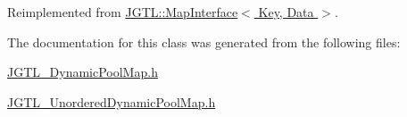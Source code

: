 Reimplemented from \hyperlink{class_j_g_t_l_1_1_map_interface_d5d7c32e4e413ef6fcd93ca53951ecf8}{JGTL::Map\-Interface$<$ Key, Data $>$}.

The documentation for this class was generated from the following files:\begin{CompactItemize}
\item 
\hyperlink{_j_g_t_l___dynamic_pool_map_8h}{JGTL\_\-Dynamic\-Pool\-Map.h}\item 
\hyperlink{_j_g_t_l___unordered_dynamic_pool_map_8h}{JGTL\_\-Unordered\-Dynamic\-Pool\-Map.h}\end{CompactItemize}
